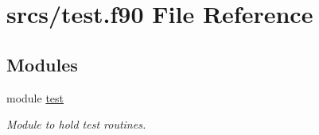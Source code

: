 \hypertarget{test_8f90}{}\section{srcs/test.f90 File Reference}
\label{test_8f90}
\subsection*{Modules}
\begin{DoxyCompactItemize}
\item 
module \mbox{\hyperlink{namespacetest}{test}}
\begin{DoxyCompactList}\small\item\em Module to hold test routines. \end{DoxyCompactList}\end{DoxyCompactItemize}
